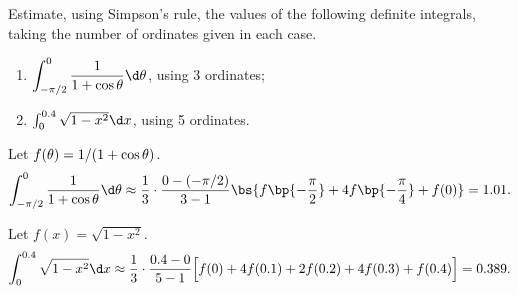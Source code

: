 \begin{problem}
    Estimate, using Simpson's rule, the values of the following definite integrals, taking the number of ordinates given in each case.

    \begin{enumerate}
        \item $\displaystyle \int_{-\pi/2}^0 \frac1{1 + \cos \t} \d \t$, using 3 ordinates;
        \item $\int_0^{0.4} \sqrt{1 - x^2} \d x$, using 5 ordinates.
    \end{enumerate}
\end{problem}
\begin{solution}
    \begin{ppart}
        Let $f(\theta) = 1/(1+\cos\theta)$. \[\int_{-\pi/2}^0 \frac1{1 + \cos\t} \d \t \approx \frac13 \cdot \frac{0 - (-\pi/2)}{3 - 1} \bs{f\bp{-\frac\pi2} + 4f\bp{-\frac\pi4} + f(0)} = 1.01.\]
    \end{ppart}
    \begin{ppart}
        Let $f(x) = \sqrt{1 - x^2}$. \[\int_0^{0.4} \sqrt{1 - x^2} \d x \approx \frac13 \cdot \frac{0.4 - 0}{5 - 1} \Big[f(0) + 4f(0.1) + 2f(0.2) + 4f(0.3) + f(0.4)\Big] = 0.389.\]
    \end{ppart}
\end{solution}

